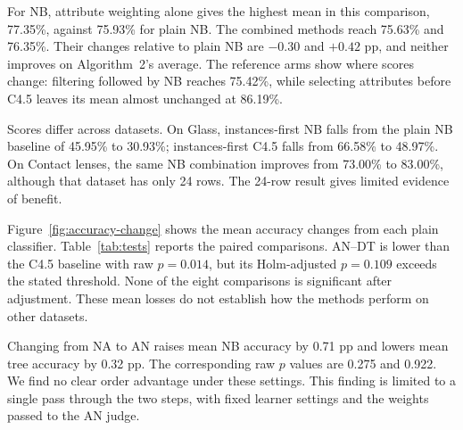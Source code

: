 \documentclass[conference]{IEEEtran}
\begin{document}
\begin{table}[t]
\caption{Protocol B scores (\%): mean $\pm$ standard deviation of ten seed-level benchmark averages; datasets have equal weight}
\label{tab:results}
\centering

\end{table}

\begin{table}[t]
\caption{Protocol B accuracy by dataset (\%). Base is the uncleaned
classifier; N is instance filtering; A is attribute selection and weighting;
NA and AN are the two Algorithm~3 orders. N--NB and A--DT are reference arms.}
\label{tab:results-datasets}
\centering
\footnotesize
\setlength{\tabcolsep}{3pt}

\end{table}

For NB, attribute weighting alone gives the highest mean in this comparison,
77.35\%, against 75.93\% for plain NB. The combined methods reach 75.63\%
and 76.35\%. Their changes relative to plain NB are $-0.30$ and $+0.42$ pp,
and neither improves on Algorithm~2's average. The reference arms show where scores change: filtering followed by NB reaches 75.42\%, while selecting
attributes before C4.5 leaves its mean almost unchanged at 86.19\%.

Scores differ across datasets. On Glass, instances-first
NB falls from the plain NB baseline of 45.95\% to 30.93\%; instances-first
C4.5 falls from 66.58\% to 48.97\%. On Contact lenses, the same NB
combination improves from 73.00\% to 83.00\%, although that dataset has
only 24 rows. The 24-row result gives limited evidence of benefit.

Figure~\ref{fig:accuracy-change} shows the mean accuracy changes from each
plain classifier. Table~\ref{tab:tests} reports the paired comparisons. AN--DT is
lower than the C4.5 baseline with raw $p=0.014$, but its Holm-adjusted
$p=0.109$ exceeds the stated threshold. None of the eight comparisons is
significant after adjustment. These mean losses do not establish how the methods perform on other datasets.

\begin{table}[t]
\caption{Dataset-level paired accuracy tests. Differences are first method
minus second; Holm adjustment covers all eight comparisons.}
\label{tab:tests}
\centering
\footnotesize

\end{table}

Changing from NA to AN raises mean NB accuracy by 0.71 pp and lowers mean
tree accuracy by 0.32 pp. The corresponding raw $p$ values are 0.275 and
0.922. We find no clear order advantage under these settings. This finding
is limited to a single pass through the two steps, with fixed learner
settings and the weights passed to the AN judge.
\end{document}
